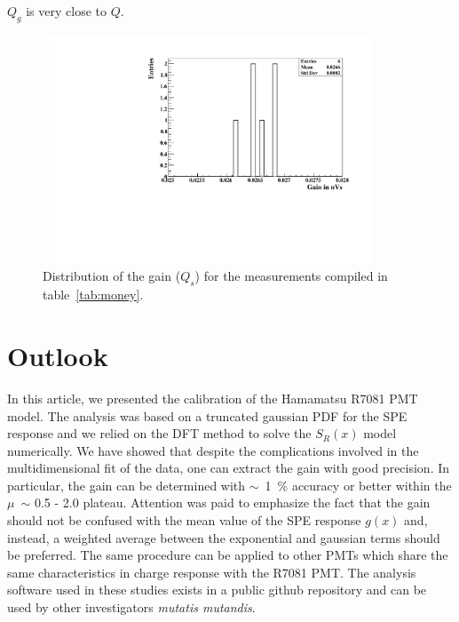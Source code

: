 \documentclass[a4paper,11pt]{article}
\begin{document}
$Q_g$ is very close to $Q$. 
\begin{figure}[!t]
\centering
\includegraphics[width=10.0cm, height=6.8cm]{figures/G.pdf} 
\caption{Distribution of the gain ($Q_s$) for the measurements compiled in table~\ref{tab:money}. }
\label{fig:g}
\end{figure}

\section{Outlook}
\label{sec:outro}

In this article, we presented the calibration of the Hamamatsu R7081 PMT model. 
The analysis was based on a truncated gaussian PDF for the SPE response and we relied on the DFT method to solve the $S_R(x)$ model numerically. 
We have showed that despite the complications involved in the multidimensional fit of the data, one can extract the gain with good precision. 
In particular, the gain can be determined with $\sim$~1~\% accuracy or better within the $\mu$~$\sim$ 0.5 - 2.0 plateau. 
Attention was paid to emphasize the fact that the gain should not be confused with the mean value of the SPE response $g(x)$ and, instead, 
a weighted average between the exponential and gaussian terms should be preferred. 
The same procedure can be applied to other PMTs which share the same characteristics in charge response with the R7081 PMT. 
The analysis software used in these studies exists in a public github repository and can be used by other investigators \emph{mutatis mutandis}. 
\end{document}
